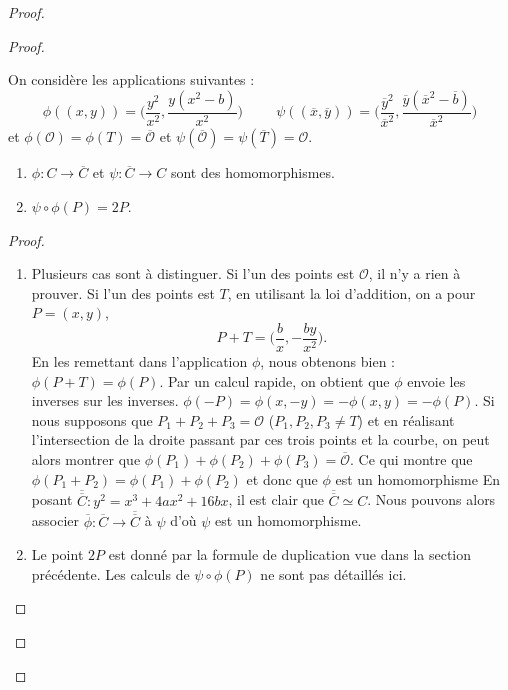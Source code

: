 \documentclass[a4paper]{article}
\begin{document}
\begin{proof}
\begin{proof}
\begin{slem} \label{prop1}
On considère les applications suivantes : 
\begin{equation*}
\phi((x,y))=\Big(\frac{y^2}{x^2},\frac{y(x^2-b)}{x^2}\Big) \hspace{1cm} \psi((\overline{x},\overline{y}))=\Big(\frac{\overline{y}^2}{\overline{x}^2},\frac{\overline{y}(\overline{x}^2-\overline{b})}{\overline{x}^2}\Big)
\end{equation*}
et $\phi(\mathcal{O})=\phi(T)=\mathcal{\overline{O}}$ et 
$\psi(\overline{\mathcal{O}})=\psi(\overline{T})=\mathcal{O}$.
\begin{enumerate} 
\item $\phi : C \rightarrow \overline{C}$ et $\psi : \overline{C} \rightarrow C$ sont des homomorphismes. 
\item $\psi \circ \phi (P)=2P$.
\end{enumerate}
\end{slem}

\begin{proof}
\begin{enumerate}
\item Plusieurs cas sont à distinguer. Si l'un des points est $\mathcal{O}$, il n'y a rien à prouver.
Si l'un des points est $T$, en utilisant la loi d'addition, on a pour $P=(x,y)$,
\begin{equation*}
P+T=\Big(\frac{b}{x},-\frac{by}{x^2}\Big).
\end{equation*}
En les remettant dans l'application $\phi$, nous obtenons bien : $\phi(P+T)=\phi(P)$. Par un calcul rapide, on obtient que $\phi$ envoie les inverses sur les inverses. 
$\phi(-P)= \phi(x,-y)=-\phi(x,y)=-\phi(P)$.
Si nous supposons que $P_{1}+P_{2}+P_{3}=\mathcal{O}$ ($P_{1},P_{2},P_{3} \ne T$) et en réalisant  l'intersection de la droite passant par ces trois points et la courbe, on peut alors montrer que $\phi(P_{1})+\phi(P_{2})+\phi(P_{3})=\overline{\mathcal{O}}$. Ce qui montre que $\phi(P_{1}+P_{2})=\phi(P_{1})+\phi(P_{2})$ et donc que $\phi$ est un homomorphisme
En posant $\overline{\overline{C}}: y^2=x^3+4ax^2+16bx$, il est clair que $\overline{\overline{C}} \simeq C$.
Nous pouvons alors associer $\overline{\phi} : \overline{C} \rightarrow \overline{\overline{C}}$ à $ \psi$ d'où $\psi$ est un homomorphisme. \\
\item Le point $2P$ est donné par la formule de duplication vue dans la section précédente. Les calculs de $\psi \circ \phi(P)$ ne sont pas détaillés ici.
\end{enumerate}
\end{proof}
 


\end{proof}
\end{proof}
\end{document}

